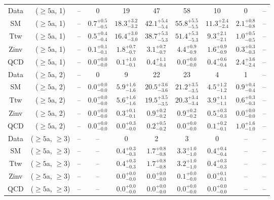 \begin{table}[h!]
{\begin{tabular}{cccccccccc}
	Data & ($\ge5$a, 1) & -- & 0 & 19 & 47 & 58 & 10 & 0 & -- \\[0.5ex] 
	SM & ($\ge5$a, 1) & -- & $0.7^{+ 0.5 }_{- 0.5 }$ & $18.3^{+ 3.2 }_{- 3.2 }$ & $42.1^{+ 5.4 }_{- 5.4 }$ & $55.8^{+ 5.5 }_{- 5.5 }$ & $11.3^{+ 2.4 }_{- 2.4 }$ & $2.1^{+ 0.8 }_{- 0.8 }$ & -- \\[0.5ex] 
	Ttw & ($\ge5$a, 1) & -- & $0.5^{+ 0.4 }_{- 0.4 }$ & $16.4^{+ 3.0 }_{- 3.0 }$ & $38.7^{+ 5.3 }_{- 5.3 }$ & $51.4^{+ 5.3 }_{- 5.3 }$ & $9.3^{+ 2.1 }_{- 2.1 }$ & $1.0^{+ 0.5 }_{- 0.5 }$ & -- \\[0.5ex] 
	Zinv & ($\ge5$a, 1) & -- & $0.1^{+ 0.1 }_{- 0.1 }$ & $1.8^{+ 0.7 }_{- 0.7 }$ & $3.1^{+ 0.7 }_{- 0.7 }$ & $4.4^{+ 0.9 }_{- 0.9 }$ & $1.6^{+ 0.9 }_{- 0.9 }$ & $0.3^{+ 0.3 }_{- 0.3 }$ & -- \\[0.5ex] 
	QCD & ($\ge5$a, 1) & -- & $0.0^{+ 0.0 }_{- 0.0 }$ & $0.1^{+ 1.0 }_{- 0.1 }$ & $0.4^{+ 1.1 }_{- 0.4 }$ & $0.0^{+ 0.0 }_{- 0.0 }$ & $0.4^{+ 0.6 }_{- 0.4 }$ & $2.4^{+ 3.6 }_{- 2.4 }$ & -- \\[0.5ex] 
	Data & ($\ge5$a, 2) & -- & 0 & 9 & 22 & 23 & 4 & 1 & -- \\[0.5ex] 
	SM & ($\ge5$a, 2) & -- & $0.0^{+ 0.0 }_{- 0.0 }$ & $5.9^{+ 1.6 }_{- 1.6 }$ & $20.5^{+ 3.6 }_{- 3.6 }$ & $21.2^{+ 3.5 }_{- 3.5 }$ & $4.5^{+ 1.2 }_{- 1.2 }$ & $0.9^{+ 0.4 }_{- 0.4 }$ & -- \\[0.5ex] 
	Ttw & ($\ge5$a, 2) & -- & $0.0^{+ 0.0 }_{- 0.0 }$ & $5.6^{+ 1.6 }_{- 1.6 }$ & $19.5^{+ 3.5 }_{- 3.5 }$ & $20.3^{+ 3.4 }_{- 3.4 }$ & $3.9^{+ 1.1 }_{- 1.1 }$ & $0.6^{+ 0.3 }_{- 0.3 }$ & -- \\[0.5ex] 
	Zinv & ($\ge5$a, 2) & -- & $0.0^{+ 0.0 }_{- 0.0 }$ & $0.3^{+ 0.1 }_{- 0.1 }$ & $0.9^{+ 0.2 }_{- 0.2 }$ & $0.9^{+ 0.2 }_{- 0.2 }$ & $0.5^{+ 0.3 }_{- 0.3 }$ & $0.0^{+ 0.0 }_{- 0.0 }$ & -- \\[0.5ex] 
	QCD & ($\ge5$a, 2) & -- & $0.0^{+ 0.0 }_{- 0.0 }$ & $0.0^{+ 0.3 }_{- 0.0 }$ & $0.2^{+ 0.5 }_{- 0.2 }$ & $0.0^{+ 0.0 }_{- 0.0 }$ & $0.1^{+ 0.2 }_{- 0.1 }$ & $1.0^{+ 1.6 }_{- 1.0 }$ & -- \\[0.5ex] 
	Data & ($\ge5$a, $\ge3$) & -- & -- & 0 & 2 & 3 & 0 & -- & -- \\[0.5ex] 
	SM & ($\ge5$a, $\ge3$) & -- & -- & $0.4^{+ 0.3 }_{- 0.3 }$ & $1.7^{+ 0.8 }_{- 0.8 }$ & $3.3^{+ 1.0 }_{- 1.0 }$ & $0.4^{+ 0.4 }_{- 0.4 }$ & -- & -- \\[0.5ex] 
	Ttw & ($\ge5$a, $\ge3$) & -- & -- & $0.4^{+ 0.3 }_{- 0.3 }$ & $1.7^{+ 0.8 }_{- 0.8 }$ & $3.2^{+ 1.0 }_{- 1.0 }$ & $0.4^{+ 0.3 }_{- 0.3 }$ & -- & -- \\[0.5ex] 
	Zinv & ($\ge5$a, $\ge3$) & -- & -- & $0.0^{+ 0.0 }_{- 0.0 }$ & $0.0^{+ 0.0 }_{- 0.0 }$ & $0.1^{+ 0.0 }_{- 0.0 }$ & $0.0^{+ 0.1 }_{- 0.1 }$ & -- & -- \\[0.5ex] 
	QCD & ($\ge5$a, $\ge3$) & -- & -- & $0.0^{+ 0.0 }_{- 0.0 }$ & $0.0^{+ 0.0 }_{- 0.0 }$ & $0.0^{+ 0.0 }_{- 0.0 }$ & $0.0^{+ 0.0 }_{- 0.0 }$ & -- & -- \\[0.5ex] 
	\hline
	\hline
\end{tabular}}
\end{table}

